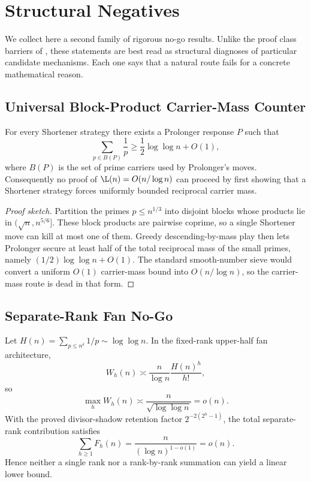 \section{Structural Negatives}\label{sec:structural-negatives}

We collect here a second family of rigorous no-go results.  Unlike the proof
class barriers of , these statements are best
read as structural diagnoses of particular candidate mechanisms.  Each one says
that a natural route fails for a concrete mathematical reason.

\subsection{Universal Block-Product Carrier-Mass Counter}

\begin{proposition}\label{prop:block-product-counter}
For every Shortener strategy there exists a Prolonger response $P$ such that
\[
\sum_{p\in B(P)}\frac1p \ge \frac12\log\log n + O(1),
\]
where $B(P)$ is the set of prime carriers used by Prolonger's moves.
Consequently no proof of $\L(n)=O(n/\log n)$ can proceed by first showing that a
Shortener strategy forces uniformly bounded reciprocal carrier mass.
\end{proposition}

\begin{proof}[Proof sketch]
Partition the primes $p\le n^{1/3}$ into disjoint blocks whose products lie in
$(\sqrt n,n^{5/6}]$.  These block products are pairwise coprime, so a single
Shortener move can kill at most one of them.  Greedy descending-by-mass play
then lets Prolonger secure at least half of the total reciprocal mass of the
small primes, namely $(1/2)\log\log n+O(1)$.  The standard smooth-number sieve
would convert a uniform $O(1)$ carrier-mass bound into $O(n/\log n)$, so the
carrier-mass route is dead in that form.
\end{proof}

\subsection{Separate-Rank Fan No-Go}

\begin{proposition}\label{prop:separate-rank-fan}
Let $H(n)=\sum_{p\le n^\delta}1/p\sim\log\log n$.  In the fixed-rank upper-half
fan architecture,
\[
W_h(n)\asymp \frac{n}{\log n}\frac{H(n)^h}{h!},
\]
so
\[
\max_h W_h(n)\asymp \frac{n}{\sqrt{\log\log n}}=o(n).
\]
With the proved divisor-shadow retention factor
$2^{-2(2^h-1)}$, the total separate-rank contribution satisfies
\[
\sum_{h\ge 1} F_h(n)
=
\frac{n}{(\log n)^{1-o(1)}}=o(n).
\]
Hence neither a single rank nor a rank-by-rank summation can yield a linear
lower bound.
\end{proposition}

